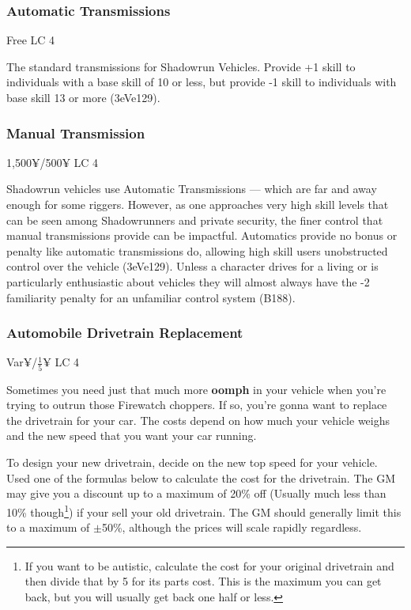 \begin{multicols*}{2}
	\subsubsection{Automatic Transmissions}
	Free LC 4
	
	The standard transmissions for Shadowrun Vehicles. Provide +1 skill to individuals with a base skill of 10 or less, but provide -1 skill to individuals with base skill 13 or more (3eVe129).
	
	\subsubsection{Manual Transmission}
	1,500¥/500¥ LC 4

	Shadowrun vehicles use Automatic Transmissions — which are far and away	enough for some riggers. However, as one approaches very high skill levels that can be seen among Shadowrunners and private security, the finer control that manual transmissions provide can be impactful. Automatics provide no bonus or penalty like automatic transmissions do, allowing high skill users unobstructed control over the vehicle (3eVe129). Unless a character drives for a living or is particularly enthusiastic about vehicles they will almost always have the -2 familiarity penalty for an unfamiliar control system (B188).
	
	\subsubsection{Automobile Drivetrain Replacement}
	Var¥/$\frac{1}{5}$¥ LC 4
	
	Sometimes you need just that much more \textbf{oomph} in your vehicle when you're trying to outrun those Firewatch choppers. If so, you're gonna want to replace the drivetrain for your car. The costs depend on how much your vehicle weighs and the new speed that you want your car running.
	
	To design your new drivetrain, decide on the new top speed for your vehicle. Used one of the formulas below to calculate the cost for the drivetrain. The GM may give you a discount up to a maximum of 20\% off (Usually much less than 10\% though\footnote{If you want to be autistic, calculate the cost for your original drivetrain and then divide that by 5 for its parts cost. This is the maximum you can get back, but you will usually get back one half or less.}) if your sell your old drivetrain. The GM should generally limit this to a maximum of $\pm$50\%, although the prices will scale rapidly regardless.
	

\end{multicols*}
